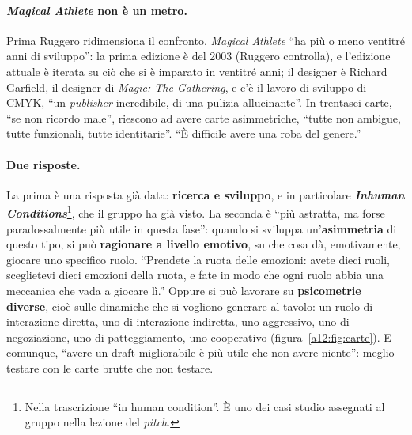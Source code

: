 \paragraph{\emph{Magical Athlete} non è un metro.} Prima Ruggero ridimensiona il confronto.
\emph{Magical Athlete} ``ha più o meno ventitré anni di sviluppo'': la prima edizione è del
2003 (Ruggero controlla), e l'edizione attuale è iterata su ciò che si è imparato in
ventitré anni; il designer è Richard Garfield, il designer di \emph{Magic: The
Gathering}, e c'è il lavoro di sviluppo di CMYK, ``un \emph{publisher} incredibile, di una
pulizia allucinante''. In trentasei carte, ``se non ricordo male'', riescono ad avere carte
asimmetriche, ``tutte non ambigue, tutte funzionali, tutte identitarie''. ``È difficile
avere una roba del genere.''

\paragraph{Due risposte.} La prima è una risposta già data: \textbf{ricerca e sviluppo}, e
in particolare \textbf{\emph{Inhuman Conditions}}\footnote{Nella trascrizione ``in human
condition''. È uno dei casi studio assegnati al gruppo nella lezione del \emph{pitch}.},
che il gruppo ha già visto. La seconda è ``più astratta, ma forse paradossalmente più
utile in questa fase'': quando si sviluppa un'\textbf{asimmetria} di questo tipo, si può
\textbf{ragionare a livello emotivo}, su che cosa dà, emotivamente, giocare uno specifico
ruolo. ``Prendete la ruota delle emozioni: avete dieci ruoli, sceglietevi dieci emozioni
della ruota, e fate in modo che ogni ruolo abbia una meccanica che vada a giocare lì.''
Oppure si può lavorare su \textbf{psicometrie diverse}, cioè sulle dinamiche che si
vogliono generare al tavolo: un ruolo di interazione diretta, uno di interazione indiretta,
uno aggressivo, uno di negoziazione, uno di patteggiamento, uno cooperativo
(figura~\ref{a12:fig:carte}). E comunque, ``avere un draft migliorabile è più utile che
non avere niente'': meglio testare con le carte brutte che non testare.

